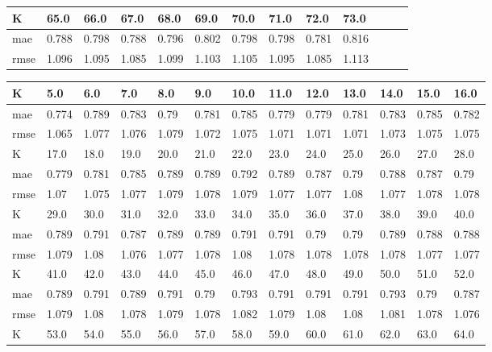 \begin{appendices}
\begin{center}
\begin{tabularx}{\textwidth}{|l|X|X|X|X|X|X|X|X|X|X|X|X|}
		\hline 
		K & 65.0 & 66.0 & 67.0 & 68.0 & 69.0 & 70.0 & 71.0 & 72.0 & 73.0  & & & \\ \hline 
		mae & 0.788 & 0.798 & 0.788 & 0.796 & 0.802 & 0.798 & 0.798 & 0.781 & 0.816 & & &  \\ \hline 
		rmse & 1.096 & 1.095 & 1.085 & 1.099 & 1.103 & 1.105 & 1.095 & 1.085 & 1.113  & & & \\ \hline 
	\end{tabularx} 
\end{center}
\begin{center} 
	\begin{tabularx}{\textwidth}{|l|X|X|X|X|X|X|X|X|X|X|X|X|} 
		\hline 
		K & 5.0 & 6.0 & 7.0 & 8.0 & 9.0 & 10.0 & 11.0 & 12.0 & 13.0 & 14.0 & 15.0 & 16.0 \\ \hline 
		mae & 0.774 & 0.789 & 0.783 & 0.79 & 0.781 & 0.785 & 0.779 & 0.779 & 0.781 & 0.783 & 0.785 & 0.782 \\ \hline 
		rmse & 1.065 & 1.077 & 1.076 & 1.079 & 1.072 & 1.075 & 1.071 & 1.071 & 1.071 & 1.073 & 1.075 & 1.075 \\ \hline 
		\hline 
		K & 17.0 & 18.0 & 19.0 & 20.0 & 21.0 & 22.0 & 23.0 & 24.0 & 25.0 & 26.0 & 27.0 & 28.0 \\ \hline 
		mae & 0.779 & 0.781 & 0.785 & 0.789 & 0.789 & 0.792 & 0.789 & 0.787 & 0.79 & 0.788 & 0.787 & 0.79 \\ \hline 
		rmse & 1.07 & 1.075 & 1.077 & 1.079 & 1.078 & 1.079 & 1.077 & 1.077 & 1.08 & 1.077 & 1.078 & 1.078 \\ \hline 
		\hline 
		K & 29.0 & 30.0 & 31.0 & 32.0 & 33.0 & 34.0 & 35.0 & 36.0 & 37.0 & 38.0 & 39.0 & 40.0 \\ \hline 
		mae & 0.789 & 0.791 & 0.787 & 0.789 & 0.789 & 0.791 & 0.791 & 0.79 & 0.79 & 0.789 & 0.788 & 0.788 \\ \hline 
		rmse & 1.079 & 1.08 & 1.076 & 1.077 & 1.078 & 1.08 & 1.078 & 1.078 & 1.078 & 1.078 & 1.077 & 1.077 \\ \hline 
		\hline 
		K & 41.0 & 42.0 & 43.0 & 44.0 & 45.0 & 46.0 & 47.0 & 48.0 & 49.0 & 50.0 & 51.0 & 52.0 \\ \hline 
		mae & 0.789 & 0.791 & 0.789 & 0.791 & 0.79 & 0.793 & 0.791 & 0.791 & 0.791 & 0.793 & 0.79 & 0.787 \\ \hline 
		rmse & 1.079 & 1.08 & 1.078 & 1.079 & 1.078 & 1.082 & 1.079 & 1.08 & 1.08 & 1.081 & 1.078 & 1.076 \\ \hline 
		\hline 
		K & 53.0 & 54.0 & 55.0 & 56.0 & 57.0 & 58.0 & 59.0 & 60.0 & 61.0 & 62.0 & 63.0 & 64.0 \\ \hline 

\end{tabularx}
\end{center}
\end{appendices}
